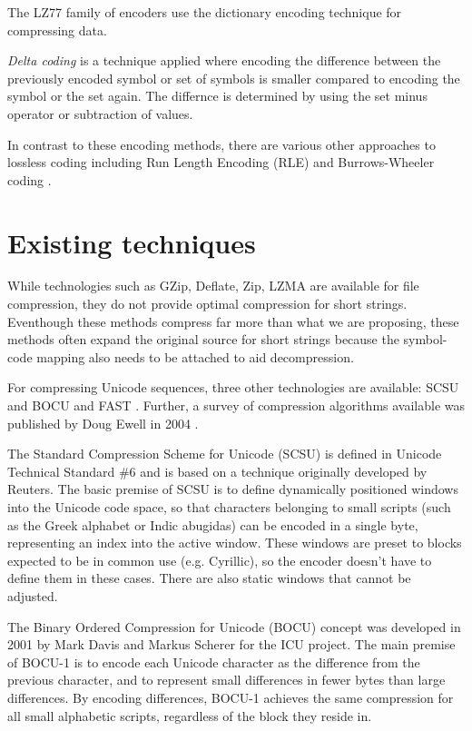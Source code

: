 \documentclass[]{article}
\begin{document}
The LZ77 family of encoders use the dictionary encoding technique for compressing data. \cite{4}

\emph{Delta coding} is a technique applied where encoding the difference between the previously encoded symbol or set of symbols is smaller compared to encoding the symbol or the set again.  The differnce is determined by using the set minus operator or subtraction of values. \cite{5}

In contrast to these encoding methods, there are various other approaches to lossless coding including Run Length Encoding (RLE) and Burrows-Wheeler coding \cite{6}.

\section{Existing techniques}

While technologies such as GZip, Deflate, Zip, LZMA are available for file compression, they do not provide optimal compression for short strings.  Eventhough these methods compress far more than what we are proposing, these methods often expand the original source for short strings because the symbol-code mapping also needs to be attached to aid decompression.

For compressing Unicode sequences, three other technologies are available: SCSU \cite{10} and BOCU \cite{11} and FAST \cite{12}.  Further, a survey of compression algorithms available was published by Doug Ewell in 2004 \cite{13}.

The Standard Compression Scheme for Unicode (SCSU) is defined in Unicode Technical Standard \#6 and is based on a technique originally developed by Reuters. The basic premise of SCSU is to define dynamically positioned windows into the Unicode code space, so that characters belonging to small scripts (such as the Greek alphabet or Indic abugidas) can be
encoded in a single byte, representing an index into the active window. These windows are preset to blocks expected to be in common use (e.g. Cyrillic), so the encoder doesn’t have to define them in these cases. There are also static windows that cannot be adjusted. \cite{10} \cite{13}

The Binary Ordered Compression for Unicode (BOCU) concept was developed in 2001 by Mark Davis and Markus Scherer for the ICU project. The main premise of BOCU-1 is to encode each Unicode character as the difference from the previous character, and to represent small differences in fewer bytes than large differences. By encoding differences, BOCU-1 achieves the same compression for all small alphabetic scripts, regardless of the block they reside in. \cite{11} \cite{13}
\end{document}
